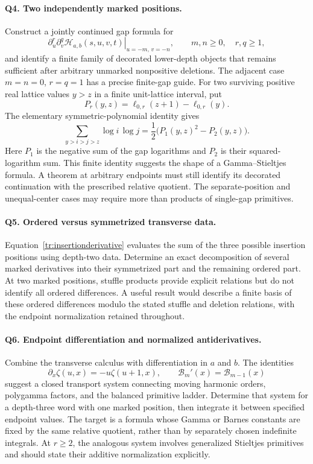\documentclass[11pt,letterpaper]{article}
\numberwithin{equation}{section}
\theoremstyle{plain}
\theoremstyle{definition}
\theoremstyle{remark}
\newcommand{\HH}{\mathcal H}
\begin{document}
\paragraph{Q4. Two independently marked positions.}
Construct a jointly continued gap formula for
\[
 \left.\partial_u^r\partial_v^q
       \HH_{a,b}(s,u,v,t)\right|_{u=-m,\,v=-n},
 \qquad m,n\geq0,\quad r,q\geq1,
\]
and identify a finite family of decorated lower-depth objects that
remains sufficient after arbitrary unmarked nonpositive deletions.
The adjacent case $m=n=0$, $r=q=1$ has a precise finite-gap guide.
For two surviving positive real lattice values $y>z$ in a finite
unit-lattice interval, put
\[
 P_r(y,z)=\ell_{0,r}(z+1)-\ell_{0,r}(y).
\]
The elementary symmetric-polynomial identity gives
\[
 \sum_{y>i>j>z}\log i\,\log j
                 =\frac12\bigl(P_1(y,z)^2-P_2(y,z)\bigr).
\]
Here $P_1$ is the negative sum of the gap logarithms and $P_2$ is
their squared-logarithm sum. This finite identity suggests the shape
of a Gamma--Stieltjes formula. A theorem at arbitrary endpoints must
still identify its decorated continuation with the prescribed
relative quotient. The separate-position and unequal-center cases
may require more than products of single-gap primitives.

\paragraph{Q5. Ordered versus symmetrized transverse data.}
Equation~\eqref{tr:insertionderivative} evaluates the sum of the three
possible insertion positions using depth-two data. Determine an exact
decomposition of several marked derivatives into their symmetrized
part and the remaining ordered part. At two marked positions,
stuffle products provide explicit relations but do not identify all
ordered differences. A useful result would describe a finite basis
of these ordered differences modulo the stated stuffle and deletion
relations, with the endpoint normalization retained throughout.

\paragraph{Q6. Endpoint differentiation and normalized antiderivatives.}
Combine the transverse calculus with differentiation in $a$ and $b$.
The identities
\[
 \partial_x\zeta(u,x)=-u\zeta(u+1,x),\qquad
 \mathcal B_m'(x)=\mathcal B_{m-1}(x)
\]
suggest a closed transport system connecting moving harmonic orders,
polygamma factors, and the balanced primitive ladder. Determine that
system for a depth-three word with one marked position, then integrate
it between specified endpoint values. The target is a formula whose
Gamma or Barnes constants are fixed by the same relative quotient,
rather than by separately chosen indefinite integrals. At $r\geq2$,
the analogous system involves generalized Stieltjes primitives and
should state their additive normalization explicitly.
\end{document}
